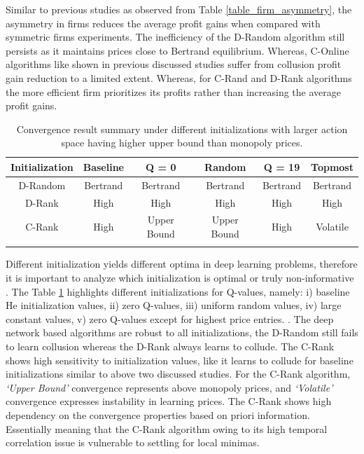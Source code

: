 \documentclass{article}
\begin{document}
Similar to previous studies as observed from Table \ref{table_firm_asymmetry}, the asymmetry in firms reduces the average profit gains when compared with symmetric firms experiments.
The inefficiency of the D-Random algorithm still persists as it maintains prices close to Bertrand equilibrium.
Whereas, C-Online algorithms like shown in previous discussed studies suffer from collusion profit gain reduction to a limited extent.
Whereas, for C-Rand and D-Rank algorithms the more efficient firm prioritizes its profits rather than increasing the average profit gains.


\begin{table}[t]
\centering
\caption{Convergence result summary under different initializations with larger action space having higher upper bound than monopoly prices.}
     \label{table_different_initializations}
    \begin{center}
        \begin{tabular}{cccccc}
        \toprule
            Initialization & Baseline & Q = 0 & Random & Q = 19 & Topmost \\
        \midrule 
             D-Random & Bertrand & Bertrand & Bertrand & Bertrand & Bertrand \\
             D-Rank & High & High & High & High & High \\
             C-Rank & High & Upper Bound & Upper Bound & High & Volatile \\
        \bottomrule
        \\
       \end{tabular}
     \end{center}
\end{table}


Different initialization yields different optima in deep learning problems, therefore it is important to analyze which initialization is optimal or truly non-informative \cite{sutskever2013importance}.
The Table \ref{table_different_initializations} highlights different initializations for Q-values, namely: i) baseline He initialization values, ii) zero Q-values, iii) uniform random values, iv) large constant values, v) zero Q-values except for highest price entries.
\cite{he2015delving}.
The deep network based algorithms are robust to all initializations, the D-Random still fails to learn collusion whereas the D-Rank always learns to collude.
The C-Rank shows high sensitivity to initialization values, like it learns to collude for baseline initializations similar to above two discussed studies.
For the C-Rank algorithm, \textit{`Upper Bound’} convergence represents above monopoly prices, and \textit{`Volatile’} convergence expresses instability in learning prices.
The C-Rank shows high dependency on the convergence properties based on priori information.
Essentially meaning that the C-Rank algorithm owing to its high temporal correlation issue is vulnerable to settling for local minimas.
\end{document}
